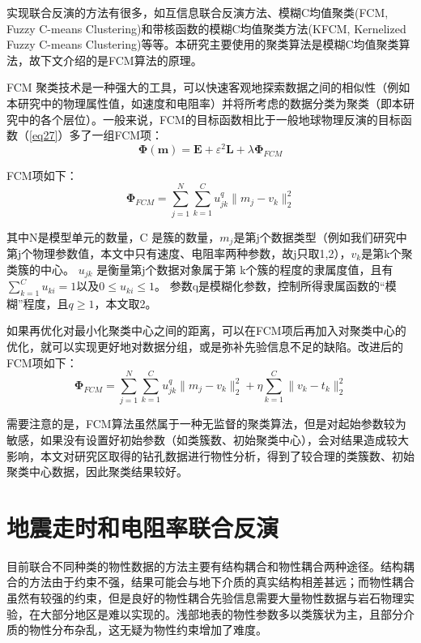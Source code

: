 实现联合反演的方法有很多，如互信息联合反演方法、模糊C均值聚类(FCM, Fuzzy C-means Clustering)和带核函数的模糊C均值聚类方法(KFCM, Kernelized Fuzzy C-means Clustering)等等。本研究主要使用的聚类算法是模糊C均值聚类算法，故下文介绍的是FCM算法的原理。

FCM 聚类技术是一种强大的工具，可以快速客观地探索数据之间的相似性（例如本研究中的物理属性值，如速度和电阻率）并将所考虑的数据分类为聚类（即本研究中的各个层位）。一般来说，FCM的目标函数相比于一般地球物理反演的目标函数（\ref{eq27}）多了一组FCM项：
\begin{equation}
    \mathbf{\Phi}(\mathbf{m})=\mathbf{E}+\varepsilon^2\mathbf{L}+\lambda\mathbf{\Phi}_{FCM}
    \label{fcmformula}
\end{equation}

FCM项如下：
\begin{equation}
    \mathbf{\Phi}_{FCM}=\sum_{j=1}^{N}\sum_{k=1}^Cu_{jk}^q\|m_j-v_k\|_2^2
    \label{fcmcondition}
\end{equation}

其中N是模型单元的数量，C 是簇的数量，$m_j$是第j个数据类型（例如我们研究中第j个物理参数值，本文中只有速度、电阻率两种参数，故j只取1,2），$v_k$是第k个聚类簇的中心。 $u_{jk}$ 是衡量第j个数据对象属于第 k个簇的程度的隶属度值，且有$\sum_{k=1}^Cu_{ki}=1$以及$0\le u_{ki}\le1$。 参数q是模糊化参数，控制所得隶属函数的“模糊”程度，且$q\ge1$，本文取2。

如果再优化对最小化聚类中心之间的距离，可以在FCM项后再加入对聚类中心的优化，就可以实现更好地对数据分组，或是弥补先验信息不足的缺陷。改进后的FCM项如下：
\begin{equation}
    \mathbf{\Phi}_{FCM}=\sum_{j=1}^{N}\sum_{k=1}^Cu_{jk}^q\|m_j-v_k\|_2^2+\eta\sum_{k=1}^C\|v_k-t_k\|_2^2
    \label{fcmcondition2}
\end{equation}

需要注意的是，FCM算法虽然属于一种无监督的聚类算法，但是对起始参数较为敏感，如果没有设置好初始参数（如类簇数、初始聚类中心），会对结果造成较大影响，本文对研究区取得的钻孔数据进行物性分析，得到了较合理的类簇数、初始聚类中心数据，因此聚类结果较好。

\newpage
\section{地震走时和电阻率联合反演}

目前联合不同种类的物性数据的方法主要有结构耦合和物性耦合两种途径。结构耦合的方法由于约束不强，结果可能会与地下介质的真实结构相差甚远；而物性耦合虽然有较强的约束，但是良好的物性耦合先验信息需要大量物性数据与岩石物理实验，在大部分地区是难以实现的。浅部地表的物性参数多以类簇状为主，且部分介质的物性分布杂乱，这无疑为物性约束增加了难度。

